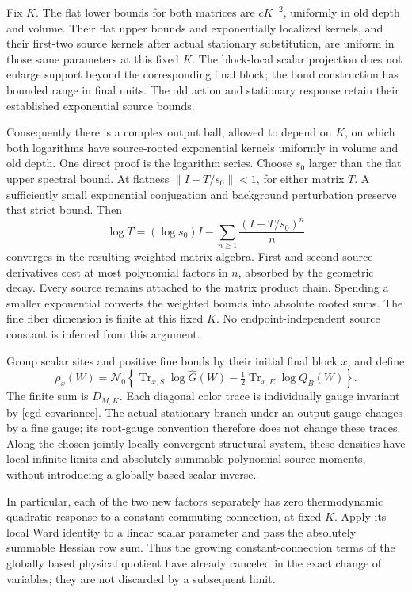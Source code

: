 \documentclass[11pt]{article}
\theoremstyle{remark}
\begin{document}
Fix \(K\). The flat lower bounds for both matrices are
\(cK^{-2}\), uniformly in old depth and volume. Their
flat upper bounds and exponentially localized kernels,
and their first-two source kernels after actual
stationary substitution, are uniform in those same
parameters at this fixed \(K\).
The block-local scalar projection does not enlarge
support beyond the corresponding final block; the
bond construction has bounded range in final units.
The old action and stationary response retain their
established exponential source bounds.

Consequently there is a complex output ball, allowed
to depend on \(K\), on which both logarithms have
source-rooted exponential kernels uniformly in volume
and old depth. One direct proof is the logarithm series.
Choose \(s_0\) larger than the flat upper spectral bound.
At flatness \(\|I-T/s_0\|<1\), for either matrix \(T\).
A sufficiently small exponential conjugation and
background perturbation preserve that strict bound.
Then
\[
 \log T=(\log s_0)I-
       \sum_{n\ge1}\frac{(I-T/s_0)^n}{n}
\]
converges in the resulting weighted matrix algebra.
First and second source derivatives cost at most
polynomial factors in \(n\), absorbed by the geometric
decay. Every source remains attached to the matrix
product chain. Spending a smaller exponential converts
the weighted bounds into absolute rooted sums.
The fine fiber dimension is finite at this fixed \(K\).
No endpoint-independent source constant is inferred
from this argument.

Group scalar sites and positive fine bonds by their
initial final block \(x\), and define
\begin{equation}
 \rho_x(W)=\mathcal N_0\left\{
  \operatorname{Tr}_{x,S}\log\widehat G(W)
       -\tfrac12\operatorname{Tr}_{x,E}\log Q_B(W)\right\}.
 \label{cgd-density}
\end{equation}
The finite sum is \(D_{M,K}\). Each diagonal color
trace is individually gauge invariant by
\eqref{cgd-covariance}. The actual stationary branch
under an output gauge changes by a fine gauge; its
root-gauge convention therefore does not change these
traces. Along the chosen jointly locally convergent structural
system, these densities have local infinite limits
and absolutely summable polynomial source moments,
without introducing a globally based scalar inverse.

In particular, each of the two new factors separately
has zero thermodynamic quadratic response to a
constant commuting connection, at fixed \(K\).
Apply its local Ward identity to a linear scalar
parameter and pass the absolutely summable Hessian
row sum. Thus the growing constant-connection terms
of the globally based physical quotient have
already canceled in the exact change of variables;
they are not discarded by a subsequent limit.
\end{document}
